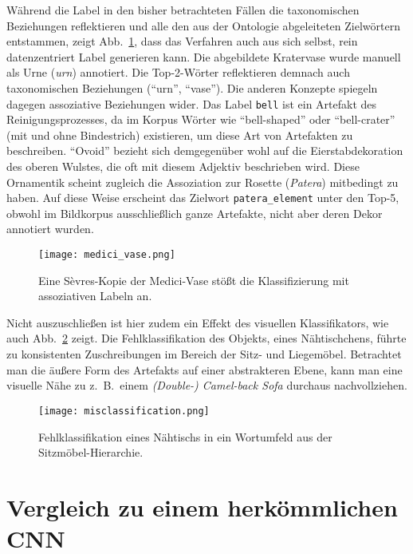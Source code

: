 Während die Label in den bisher betrachteten Fällen die taxonomischen Beziehungen reflektieren und alle den aus der Ontologie abgeleiteten Zielwörtern entstammen, zeigt Abb.~\ref{fig:medici_vase}, dass das Verfahren auch aus sich selbst, rein datenzentriert Label generieren kann. Die abgebildete Kratervase wurde manuell als Urne (\emph{urn}) annotiert. Die \mbox{Top-2-Wörter} reflektieren demnach auch taxonomischen Beziehungen (\mbox{\enquote{urn}}, \mbox{\enquote{vase}}). Die anderen Konzepte spiegeln dagegen assoziative Beziehungen wider. Das Label \texttt{bell} ist ein Artefakt des Reinigungsprozesses, da im Korpus Wörter wie \mbox{\enquote{bell-shaped}} oder \mbox{\enquote{bell-crater}} (mit und ohne Bindestrich) existieren, um diese Art von Artefakten zu beschreiben. \enquote{Ovoid} bezieht sich demgegenüber wohl auf die Eierstabdekoration des oberen Wulstes, die oft mit diesem Adjektiv beschrieben wird. Diese Ornamentik scheint zugleich die Assoziation zur Rosette (\emph{Patera}) mitbedingt zu haben. Auf diese Weise erscheint das Zielwort \texttt{patera\_element} unter den \mbox{Top-5}, obwohl im Bildkorpus ausschließlich ganze Artefakte, nicht aber deren Dekor annotiert wurden. 

\begin{figure}
	\centering
	\texttt{[image: medici\_vase.png]}
	\caption{Eine Sèvres-Kopie der Medici-Vase stößt die Klassifizierung mit assoziativen Labeln an. \parencite{victoriaalbertmuseum_VaseSevresCopyMediciVase_2019}}
	\label{fig:medici_vase}
\end{figure}

Nicht auszuschließen ist hier zudem ein Effekt des visuellen Klassifikators, wie auch Abb.~\ref{fig:misclassification} zeigt. Die Fehlklassifikation des Objekts, eines Nähtischchens, führte zu konsistenten Zuschreibungen im Bereich der Sitz- und Liegemöbel. Betrachtet man die äußere Form des Artefakts auf einer abstrakteren Ebene, kann man eine visuelle Nähe zu z.~B.~einem \emph{(Double-) Camel-back Sofa} durchaus nachvollziehen.

\begin{figure}
	\centering
	\texttt{[image: misclassification.png]}
	\caption{Fehlklassifikation eines Nähtischs in ein Wortumfeld aus der Sitzmöbel-Hierarchie. \parencite[S.~88]{sheraton_FurnitureDesignsThomasSheraton_1910}}
	\label{fig:misclassification}
\end{figure}


\section{Vergleich zu einem herkömmlichen CNN}

